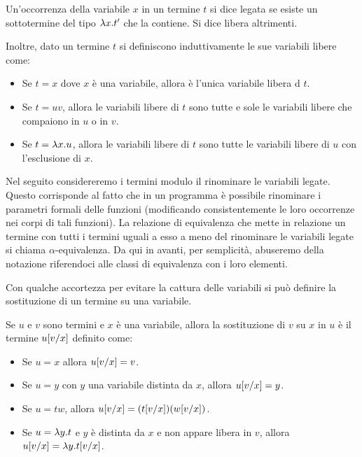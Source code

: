 \documentclass[]{marticle}
\begin{document}
\begin{block}[Definizione]
    Un'occorrenza della variabile $x$ in un termine $t$ si dice legata se esiste
    un sottotermine del tipo $\lambda x. t'$ che la contiene. Si dice libera
    altrimenti.

    Inoltre, dato un termine $t$ si definiscono induttivamente le sue variabili
    libere come:
    \begin{itemize}
        \item Se $t=x$ dove $x$ \`e una variabile, allora \`e l'unica variabile
            libera d $t$.
        \item Se $t=uv$, allora le variabili libere di $t$ sono tutte e sole le
            variabili libere che compaiono in $u$ o in $v$.
        \item Se $t=\lambda x. u$, allora le variabili libere di $t$ sono tutte le
            variabili libere di $u$ con l'esclusione di $x$.
    \end{itemize}
\end{block}

Nel seguito considereremo i termini modulo il rinominare le variabili legate.
Questo corrisponde al fatto che in un programma \`e possibile rinominare i
parametri formali delle funzioni (modificando consistentemente le loro
occorrenze nei corpi di tali funzioni). La relazione di equivalenza che mette in
relazione un termine con tutti i termini uguali a esso a meno del rinominare le
variabili legate si chiama $\alpha$-equivalenza. Da qui in avanti, per
semplicit\`a, abuseremo della notazione riferendoci alle classi di equivalenza
con i loro elementi.

Con qualche accortezza per evitare la cattura delle variabili si pu\`o definire
la sostituzione di un termine su una variabile.

\begin{block}[Definizione]
    Se $u$ e $v$ sono termini e $x$ \`e una variabile, allora
    la sostituzione di $v$ su $x$ in $u$ \`e il termine $u [v/x]$ definito
    come:
    \begin{itemize}
        \item Se $u=x$ allora $u [v/x] = v$.
        \item Se $u=y$ con $y$ una variabile distinta da $x$, allora $u
            [v/x] = y$.
        \item Se $u = tw$, allora $u [v/x] = (t [v/x])(w [v/x])
            $.
        \item Se $u = \lambda y. t$ e $y$ \`e distinta da $x$ e non appare libera in
            $v$, allora $u [v/x] = \lambda y. t[v/x]$.
    \end{itemize}
\end{block}
\end{document}
